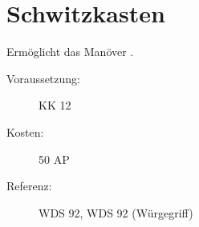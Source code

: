 \section{Schwitzkasten}
\label{sf.schwitzkasten}
Ermöglicht das Manöver .
\begin{description}
    \item[Voraussetzung:]
        KK 12
    \item [Kosten:]
        50 AP
    \item [Referenz:]
        WDS 92, WDS 92 (Würgegriff)
\end{description}
